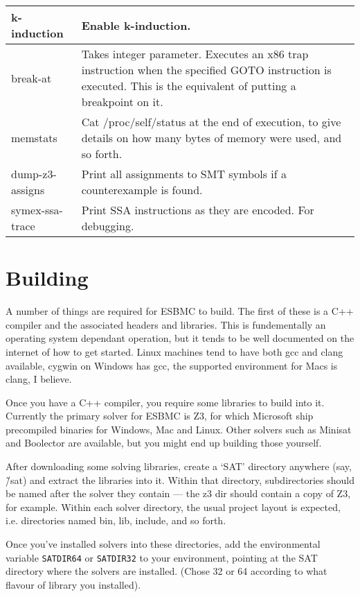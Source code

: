 \documentclass{article}
\begin{document}
\begin{longtable}{| p{} | p{} |}
\hline
k-induction & Enable k-induction.\\
\hline
break-at & Takes integer parameter. Executes an x86 trap instruction when the
specified GOTO instruction is executed. This is the equivalent of putting a
breakpoint on it.\\
\hline
memstats & Cat /proc/self/status at the end of execution, to give details on
how many bytes of memory were used, and so forth.\\
\hline
dump-z3-assigns & Print all assignments to SMT symbols if a counterexample
is found.\\
\hline
symex-ssa-trace & Print SSA instructions as they are encoded. For debugging.\\
\hline
\end{longtable}

\section{Building}

A number of things are required for ESBMC to build. The first of these is a
C++ compiler and the associated headers and libraries. This is fundementally
an operating system dependant operation, but it tends to be well documented
on the internet of how to get started. Linux machines tend to have both gcc
and clang available, cygwin on Windows has gcc, the supported environment for
Macs is clang, I believe.

Once you have a C++ compiler, you require some libraries to build into it.
Currently the primary solver for ESBMC is Z3, for which Microsoft ship
precompiled binaries for Windows, Mac and Linux. Other solvers such as Minisat
and Boolector are available, but you might end up building those yourself.

After downloading some solving libraries, create a `SAT' directory anywhere
(say, \~/sat) and extract the libraries into it. Within that directory,
subdirectories should be named after the solver they contain --- the z3 dir
should contain a copy of Z3, for example. Within each solver directory, the
usual project layout is expected, i.e. directories named bin, lib, include,
and so forth.

Once you've installed solvers into these directories, add the environmental
variable \texttt{SATDIR64} or \texttt{SATDIR32} to your environment, pointing
at the SAT directory where the solvers are installed. (Chose 32 or 64 according
to what flavour of library you installed).
\end{document}
